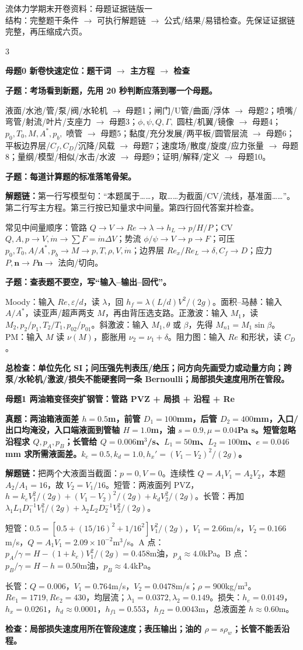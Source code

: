 \documentclass[a4paper]{article}
\newcommand{\mt}[1]{\vspace{2pt}\colorbox{M}{\parbox{\dimexpr\linewidth-2\fboxsep}{\color{white}\bfseries #1}}\par}
\newcommand{\qt}[1]{\vspace{1pt}\colorbox{Q}{\parbox{\dimexpr\linewidth-2\fboxsep}{\color{white}\bfseries #1}}\par}
\newcommand{\ans}[1]{\colorbox{G}{\parbox{\dimexpr\linewidth-2\fboxsep}{#1}}\par}
\newcommand{\warn}[1]{\colorbox{Y}{\parbox{\dimexpr\linewidth-2\fboxsep}{\color{E}\bfseries #1}}\par}
\newcommand{\chain}[1]{{\color{A}\bfseries 解题链：}#1\par}
\begin{document}
\fontsize{6.0}{6.7}\selectfont
\begin{center}
{\heiti\Large 流体力学期末开卷资料：母题证据链版一}\\[-1pt]
{\small 结构：完整题干条件 $\rightarrow$ 可执行解题链 $\rightarrow$ 公式/结果/易错检查。先保证证据链完整，再压缩成六页。}
\end{center}

\begin{multicols}{3}

\mt{母题0 新卷快速定位：题干词 $\to$ 主方程 $\to$ 检查}
\qt{子题：考场看到新题，先用 20 秒判断应落到哪一个母题。}
\ans{液面/水池/管/泵/阀/水轮机 $\to$ 母题1；闸门/U管/曲面/浮体 $\to$ 母题2；喷嘴/弯管/射流/叶片/支座力 $\to$ 母题3；$\phi,\psi,Q,\Gamma,$ 圆柱/机翼/镜像 $\to$ 母题4；$p_0,T_0,M,A^*,p_b,$ 喷管 $\to$ 母题5；黏度/充分发展/两平板/圆管层流 $\to$ 母题6；平板边界层/$C_f,C_D$/沉降/风载 $\to$ 母题7；速度场/散度/旋度/应力张量 $\to$ 母题8；量纲/模型/相似/水击/水波 $\to$ 母题9；证明/解释/定义 $\to$ 母题10。}
\qt{子题：每道计算题的标准落笔骨架。}
\chain{第一行写模型句：“本题属于……，取……为截面/CV/流线，基准面……”。第二行写主方程。第三行按已知量求中间量。第四行回代答案并检查。}
\ans{常见中间量顺序：管路 $Q\to V\to Re\to\lambda\to h_L\to p/H/P$；CV $Q,A,p\to V,\dot m\to \sum F=\dot m\Delta V$；势流 $\phi/\psi\to V\to p\to F$；可压 $p_0,T_0,A/A^*,p_b\to M\to p,T,\rho,V,\dot m$；边界层 $Re_x/Re_L\to\delta,C_f\to D$；应力 $P,\bm n\to P\bm n\to$ 法向/切向。}
\qt{子题：查表题不要空，写“输入--输出--回代”。}
\ans{Moody：输入 $Re,\varepsilon/d$，读 $\lambda$，回 $h_f=\lambda(L/d)V^2/(2g)$。面积--马赫：输入 $A/A^*$，读亚声/超声两支 $M$，再由背压选支路。正激波：输入 $M_1$，读 $M_2,p_2/p_1,T_2/T_1,p_{02}/p_{01}$。斜激波：输入 $M_1,\theta$ 或 $\beta$，先得 $M_{n1}=M_1\sin\beta$。PM：输入 $M$ 读 $\nu(M)$，膨胀用 $\nu_2=\nu_1+\delta$。阻力图：输入 $Re$ 和形状，读 $C_D$。}
\warn{总检查：单位先化 SI；问压强先判表压/绝压；问方向先画受力或动量方向；跨泵/水轮机/激波/损失不能硬套同一条 Bernoulli；局部损失速度用所在管段。}

\mt{母题1 两油箱变径突扩钢管：管路 PVZ + 局损 + 沿程 + Re}
\qt{真题：两油箱液面差 $h=0.5$m，前管 $D_1=100$mm，后管 $D_2=400$mm，入口/出口均淹没，入口端液面到管轴 $H=1.0$m，油 $s=0.9,\mu=0.04$Pa s。短管忽略沿程求 $Q,p_A,p_B$；长管给 $Q=0.006$m$^3$/s、$L_1=50$m、$L_2=100$m、$e=0.046$mm 求所需液面差。$k_e=0.5,k_d=1.0,h_x'=(V_1-V_2)^2/(2g)$。}
\chain{把两个大液面当截面：$p=0,V=0$。连续性 $Q=A_1V_1=A_2V_2$，本题 $A_2/A_1=16$，故 $V_2=V_1/16$。短管：两液面列 PVZ，$h=k_eV_1^2/(2g)+(V_1-V_2)^2/(2g)+k_dV_2^2/(2g)$。长管：再加 $\lambda_1L_1D_1^{-1}V_1^2/(2g)+\lambda_2L_2D_2^{-1}V_2^2/(2g)$。}
\ans{短管：$0.5=[0.5+(15/16)^2+1/16^2]V_1^2/(2g)$，$V_1=2.66$m/s，$V_2=0.166$m/s，$Q=A_1V_1=2.09\times10^{-2}$m$^3$/s。A 点：$p_A/\gamma=H-(1+k_e)V_1^2/(2g)=0.458$m油，$p_A\approx4.0$kPa。B 点：$p_B/\gamma=H-h=0.50$m油，$p_B\approx4.4$kPa。}
\ans{长管：$Q=0.006$，$V_1=0.764$m/s，$V_2=0.0478$m/s；$\rho=900$kg/m$^3$。$Re_1=1719,Re_2=430$，均层流；$\lambda_1=0.0372,\lambda_2=0.149$。损失：$h_e=0.0149$，$h_x=0.0261$，$h_d\approx0.0001$，$h_{f1}=0.553$，$h_{f2}=0.0043$m，总液面差 $h\approx0.60$m。}
\warn{检查：局部损失速度用所在管段速度；表压输出；油的 $\rho=s\rho_w$；长管不能丢沿程。}


\end{multicols}
\end{document}
